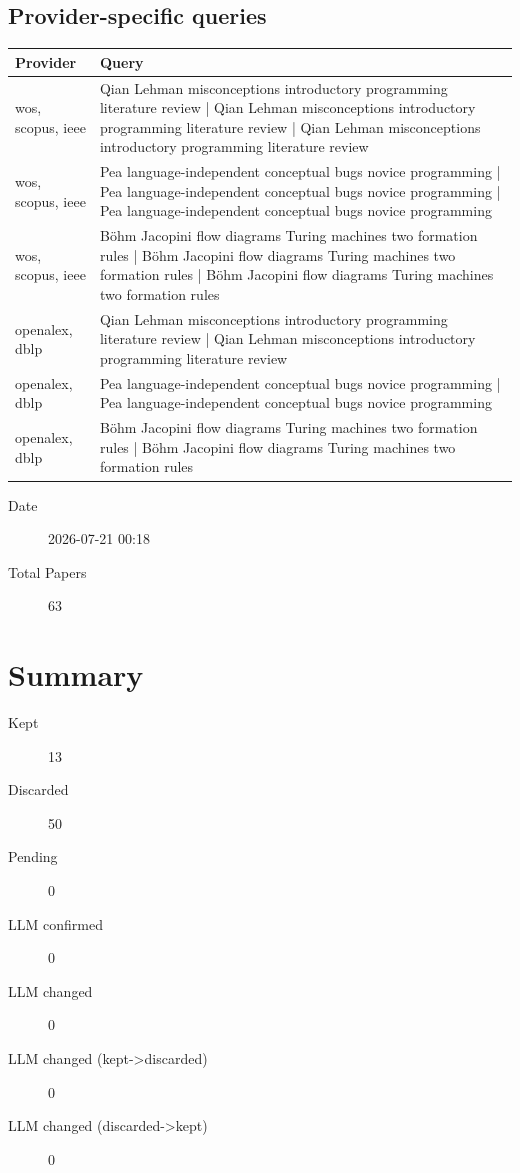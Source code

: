 \documentclass{article}
\begin{document}
\subsection{Provider-specific queries}
\begin{longtable}{lp{10cm}}
\toprule
Provider & Query \\
\midrule
wos, scopus, ieee & Qian Lehman misconceptions introductory programming literature review | Qian Lehman misconceptions introductory programming literature review | Qian Lehman misconceptions introductory programming literature review \\
wos, scopus, ieee & Pea language-independent conceptual bugs novice programming | Pea language-independent conceptual bugs novice programming | Pea language-independent conceptual bugs novice programming \\
wos, scopus, ieee & Böhm Jacopini flow diagrams Turing machines two formation rules | Böhm Jacopini flow diagrams Turing machines two formation rules | Böhm Jacopini flow diagrams Turing machines two formation rules \\
openalex, dblp & Qian Lehman misconceptions introductory programming literature review | Qian Lehman misconceptions introductory programming literature review \\
openalex, dblp & Pea language-independent conceptual bugs novice programming | Pea language-independent conceptual bugs novice programming \\
openalex, dblp & Böhm Jacopini flow diagrams Turing machines two formation rules | Böhm Jacopini flow diagrams Turing machines two formation rules \\
\bottomrule
\end{longtable}

\begin{description}
\item[Date] 2026-07-21 00:18
\item[Total Papers] 63
\end{description}

\section{Summary}
\begin{description}
\item[Kept] 13
\item[Discarded] 50
\item[Pending] 0
\item[LLM confirmed] 0
\item[LLM changed] 0
\item[LLM changed (kept->discarded)] 0
\item[LLM changed (discarded->kept)] 0
\end{description}
\end{document}
